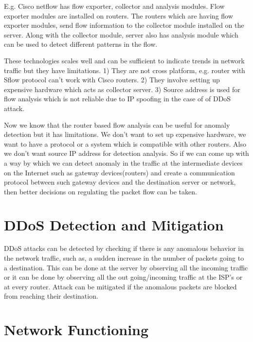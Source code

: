 \documentclass[12pt,oneside,a4paper]{article}
\begin{document}
E.g. Cisco netflow has flow exporter, collector and analysis modules. Flow exporter modules are installed on routers. The routers which are having flow exporter modules, send flow information to the collector module installed on the server. Along with the collector module, server also has analysis module which can be used to detect different patterns in the flow.\par

These technologies scales well and can be sufficient to indicate trends in network traffic but they have limitations. 1) They are not cross platform, e.g. router with Sflow protocol can't work with Cisco routers. 2) They involve setting up expensive hardware which acts as collector server. 3) Source address is used for flow analysis which is not reliable due to IP spoofing in the case of of DDoS attack.\par

Now we know that the router based flow analysis can be useful for anomaly detection but it has limitations. We don't want to set up expensive hardware, we want to have a protocol or a system which is compatible with other routers. Also we don't want source IP address for detection analysis. So if we can come up with a way by which we can detect anomaly in the traffic at the intermediate devices on the Internet such as gateway devices(routers) and create a communication protocol between such gateway devices and the destination server or network, then better decisions on regulating the packet flow can be taken.

\section{DDoS Detection and Mitigation}

DDoS attacks can be detected by checking if there is any anomalous behavior in the network traffic, such as, a sudden increase in the number of packets going to a destination. This can be done at the server by observing all the incoming traffic or it can be done by observing all the out going/incoming traffic at the ISP's or at every router. Attack can be mitigated if the anomalous packets are blocked from reaching their destination.

\section{Network Functioning}
\end{document}
